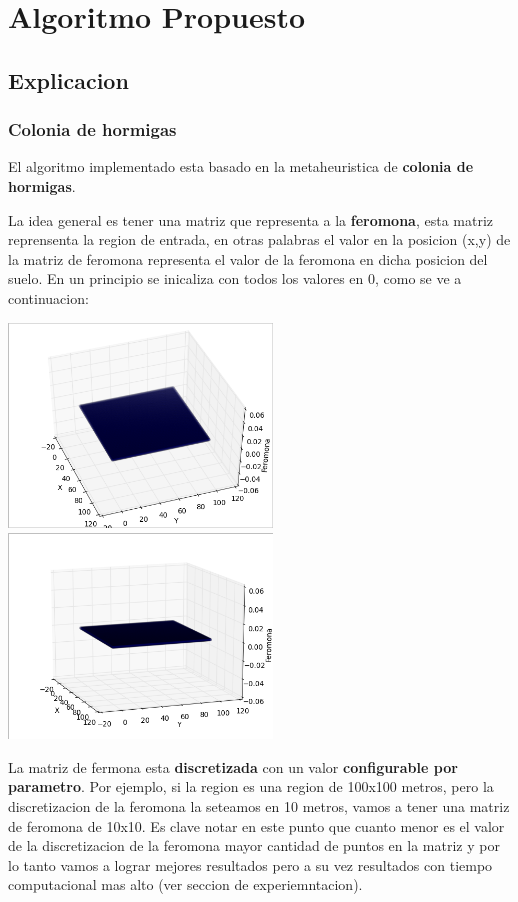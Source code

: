 \newpage
\section{Algoritmo Propuesto}\label{sec:algoritmo}
\subsection{Explicacion}

\subsubsection{Colonia de hormigas}

El algoritmo implementado esta basado en la metaheuristica de \textbf{colonia de hormigas}.

La idea general es tener una matriz que representa a la \textbf{feromona}, esta matriz reprensenta la region de entrada, en otras palabras el valor en la posicion (x,y) de la matriz de feromona representa el valor de la feromona en dicha posicion del suelo. En un principio se inicaliza con todos los valores en 0, como se ve a continuacion:


\begin{center}
\includegraphics[width=7cm]{imagenes/feromona0}
\includegraphics[width=7cm]{imagenes/feromona01}
\end{center}

La matriz de fermona esta \textbf{discretizada} con un valor \textbf{configurable por parametro}. Por ejemplo, si la region es una region de 100x100 metros, pero la discretizacion de la feromona la seteamos en 10 metros, vamos a tener una matriz de feromona de 10x10. Es clave notar en este punto que cuanto menor es el valor de la discretizacion de la feromona mayor cantidad de puntos en la matriz y por lo tanto vamos a lograr mejores resultados pero a su vez resultados con tiempo computacional mas alto (ver seccion de experiemntacion).


